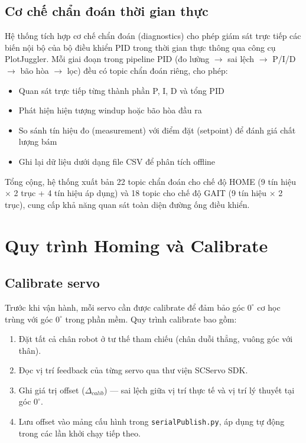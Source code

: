 \subsection{Cơ chế chẩn đoán thời gian thực}

Hệ thống tích hợp cơ chế chẩn đoán (diagnostics) cho phép giám sát trực tiếp các biến nội bộ của bộ điều khiển PID trong thời gian thực thông qua công cụ PlotJuggler. Mỗi giai đoạn trong pipeline PID (đo lường $\rightarrow$ sai lệch $\rightarrow$ P/I/D $\rightarrow$ bão hòa $\rightarrow$ lọc) đều có topic chẩn đoán riêng, cho phép:

\begin{itemize}
    \item Quan sát trực tiếp từng thành phần P, I, D và tổng PID
    \item Phát hiện hiện tượng windup hoặc bão hòa đầu ra
    \item So sánh tín hiệu đo (measurement) với điểm đặt (setpoint) để đánh giá chất lượng bám
    \item Ghi lại dữ liệu dưới dạng file CSV để phân tích offline
\end{itemize}

Tổng cộng, hệ thống xuất bản 22 topic chẩn đoán cho chế độ HOME (9 tín hiệu $\times$ 2 trục + 4 tín hiệu áp dụng) và 18 topic cho chế độ GAIT (9 tín hiệu $\times$ 2 trục), cung cấp khả năng quan sát toàn diện đường ống điều khiển.

\section{Quy trình Homing và Calibrate}

\subsection{Calibrate servo}

Trước khi vận hành, mỗi servo cần được calibrate để đảm bảo góc $0^\circ$ cơ học trùng với góc $0^\circ$ trong phần mềm. Quy trình calibrate bao gồm:

\begin{enumerate}
    \item Đặt tất cả chân robot ở tư thế tham chiếu (chân duỗi thẳng, vuông góc với thân).
    \item Đọc vị trí feedback của từng servo qua thư viện SCServo SDK.
    \item Ghi giá trị offset ($\Delta_{calib}$) --- sai lệch giữa vị trí thực tế và vị trí lý thuyết tại góc $0^\circ$.
    \item Lưu offset vào mảng cấu hình trong \texttt{serialPublish.py}, áp dụng tự động trong các lần khởi chạy tiếp theo.
\end{enumerate}


